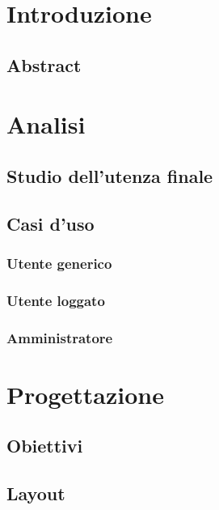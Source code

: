 \documentclass[a4paper, oneside, openany, dvipsnames, table]{article}
\begin{document}
\copertina
\tableofcontents
\newpage
\section{Introduzione}
	\subsection{Abstract}
		
	
	
\newpage
\section{Analisi}
	
	\subsection{Studio dell'utenza finale}
		
	\subsection{Casi d'uso}
		
		\subsubsection{Utente generico}
			
		\subsubsection{Utente loggato}
			
		\subsubsection{Amministratore}
			

\newpage
\section{Progettazione}
	
	\subsection{Obiettivi}
		
	\subsection{Layout}
		
\end{document}
